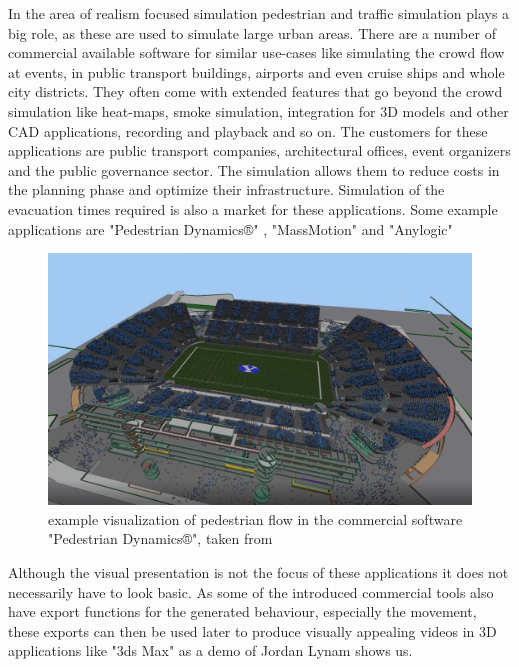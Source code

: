 \documentclass{acmsiggraph}               %
\begin{document}
In the area of realism focused simulation pedestrian and traffic simulation plays a big role, as these are used to simulate large urban areas. There are a number of commercial available software for similar use-cases like simulating the crowd flow at events, in public transport buildings, airports and even cruise ships and whole city districts. They often come with extended features that go beyond the crowd simulation like heat-maps, smoke simulation, integration for 3D models and other CAD applications, recording and playback and so on. The customers for these applications are public transport companies, architectural offices, event organizers and the public governance sector. The simulation allows them to reduce costs in the planning phase and optimize their infrastructure. Simulation of the evacuation times required is also a market for these applications. Some example applications are "Pedestrian Dynamics®" \cite{pedestrian_dynamics_pedestrian_2020}, "MassMotion"  \cite{mediaworks_pedestrian_2020} and "Anylogic" \cite{anylogic_website}

\begin{figure}[h]
  \centering
  \includegraphics[width=1\linewidth]{images/PedestrianDynamicsStadionExample.png}
  \caption{example visualization of pedestrian flow in the commercial software "Pedestrian Dynamics®",  taken from \protect\cite{pedestrian_dynamics_pedestrian_2020}}
  \label{fig:stadionEvacuationExample}
\end{figure}
Although the visual presentation is not the focus of these applications it does not necessarily have to look basic. As some of the introduced commercial tools also have export functions for the generated behaviour, especially the movement, these exports can then be used later to produce visually appealing videos in 3D applications like "3ds Max" as a demo of Jordan Lynam shows us. \cite{lynamJordan_viissim_3ds_max}
\end{document}
